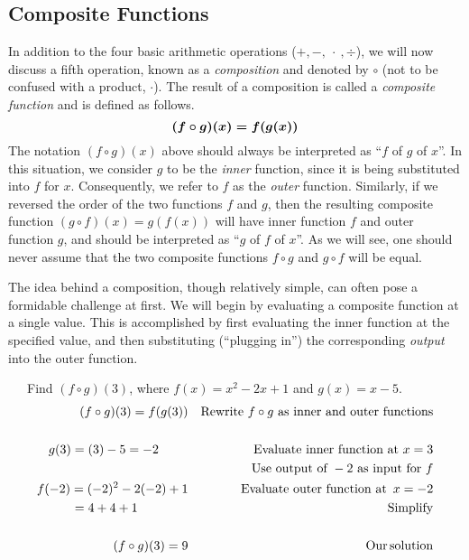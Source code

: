 \subsection{Composite Functions}



In addition to the four basic arithmetic operations ($+,-,~\cdot~,\div$), we will now discuss a fifth operation, known as a \textit{composition} and denoted by $\circ$ (not to be confused with a product, $\cdot$). The result of a composition is called a \textit{composite function} and is defined as follows.
\[ \boldsymbol{(f \circ g) (x) = f (g (x))} \]
The notation $(f\circ g)(x)$ above should always be interpreted as ``$f$ of $g$ of $x$''.  In this situation, we consider $g$ to be the \textit{inner} function, since it is being substituted into $f$ for $x$.  Consequently, we refer to $f$ as the \textit{outer} function.\pp
Similarly, if we reversed the order of the two functions $f$ and $g$, then the resulting composite function $(g\circ f)(x)=g(f(x))$ will have inner function $f$ and outer function $g$, and should be interpreted as ``$g$ of $f$ of $x$''.  As we will see, one should never assume that the two composite functions $f\circ g$ and $g\circ f$ will be equal.\pp

The idea behind a composition, though relatively simple, can often pose a formidable challenge at first.  We will begin by evaluating a composite function at a single value.  This is accomplished by first evaluating the inner function at the specified value, and
then substituting (``plugging in'') the corresponding \textit{output} into the outer function.

\begin{example}~~~Find $(f\circ g)(3)$, where $f(x)=x^2-2x+1$ and $g(x)=x-5$.
  \begin{eqnarray*}
   (f \circ g) (3)=f (g (3)) &  & \text{Rewrite~} f\circ g \text{~as~inner~and~outer~functions}\\
	    &  & \\
 	g (3) = (3) - 5 = - 2~~~~~~~ &  & \text{Evaluate~inner~function~at~} x=3\\
		& & \text{Use~output~of~} -2 \text{~as~input~for~} f\\
    f (- 2) = (- 2)^2 - 2 (- 2) + 1 &  & \operatorname{Evaluate~outer~function~at~} x=-2\\
    = 4 + 4 + 1~~~~~~~~~~~~ &  & \operatorname{Simplify}\\
    & & \\
		(f \circ g) (3) = 9 &  & \operatorname{Our} \operatorname{solution}
  \end{eqnarray*}
\end{example}
  
